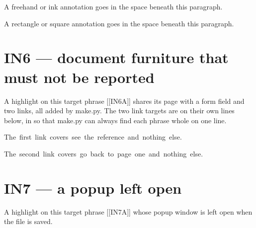 \documentclass[11pt,a4paper]{article}
\begin{document}
A freehand or ink annotation goes in the space beneath this paragraph.

\vspace{60pt}

A rectangle or square annotation goes in the space beneath this
paragraph.

\vspace{60pt}

\clearpage
\section*{IN6 --- document furniture that must not be reported}

A highlight on this target phrase [[IN6A]] shares its page with a form
field and two links, all added by make.py. The two link targets are on
their own lines below, in \mbox{} so that make.py can always find each
phrase whole on one line.

\mbox{The first link covers see the reference and nothing else.}

\mbox{The second link covers go back to page one and nothing else.}

\section*{IN7 --- a popup left open}

A highlight on this target phrase [[IN7A]] whose popup window is left
open when the file is saved.
\end{document}

